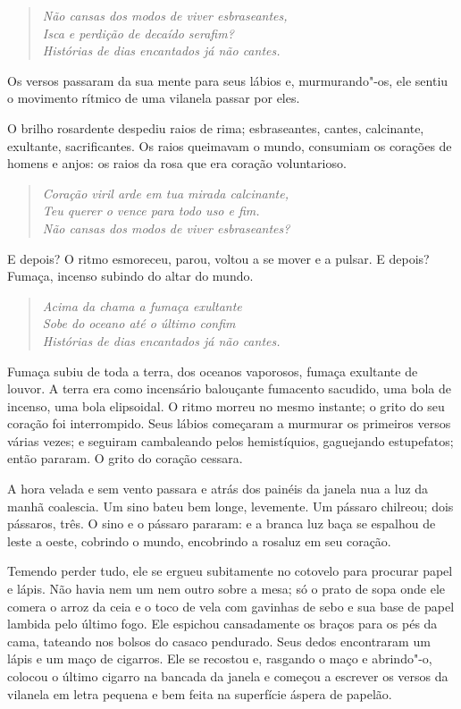 \begin{verse}\itshape
Não cansas dos modos de viver esbraseantes,\\
Isca e perdição de decaído serafim?\\
Histórias de dias encantados já não cantes.
\end{verse}

Os versos passaram da sua mente para seus lábios e, murmurando"-os, ele
sentiu o movimento rítmico de uma vilanela passar por eles.        

O brilho rosardente despediu raios de rima; esbraseantes, cantes,
calcinante, exultante, sacrificantes. Os raios queimavam o mundo,
consumiam os corações de homens e anjos: os raios da rosa que era
coração voluntarioso.

\begin{verse}\itshape
Coração viril arde em tua mirada calcinante,\\
Teu querer o vence para todo uso e fim.\\
Não cansas dos modos de viver esbraseantes?
\end{verse}

E depois? O ritmo esmoreceu, parou, voltou a se mover e a pulsar. E
depois? Fumaça, incenso subindo do altar do mundo.

\begin{verse}\itshape
Acima da chama a fumaça exultante \\
Sobe do oceano até o último confim\\
Histórias de dias encantados já não cantes.
\end{verse}

Fumaça subiu de toda a terra, dos oceanos vaporosos, fumaça exultante de
louvor. A terra era como incensário balouçante fumacento sacudido, uma
bola de incenso, uma bola elipsoidal. O ritmo morreu no mesmo instante;
o grito do seu coração foi interrompido. Seus lábios começaram a
murmurar os primeiros versos várias vezes; e seguiram cambaleando pelos
hemistíquios, gaguejando estupefatos; então pararam. O grito do coração
cessara.

A hora velada e sem vento passara e atrás dos painéis da janela nua a
luz da manhã coalescia. Um sino bateu bem longe, levemente. Um pássaro
chilreou; dois pássaros, três. O sino e o pássaro pararam: e a branca
luz baça se espalhou de leste a oeste, cobrindo o mundo, encobrindo a
rosaluz em seu coração.

Temendo perder tudo, ele se ergueu subitamente no cotovelo para procurar
papel e lápis. Não havia nem um nem outro sobre a mesa; só o prato de
sopa onde ele comera o arroz da ceia e o toco de vela com gavinhas de
sebo e sua base de papel lambida pelo último fogo. Ele espichou
cansadamente os braços para os pés da cama, tateando nos bolsos do
casaco pendurado. Seus dedos encontraram um lápis e um maço de
cigarros. Ele se recostou e, rasgando o maço e abrindo"-o, colocou o
último cigarro na bancada da janela e começou a escrever os versos da
vilanela em letra pequena e bem feita na superfície áspera de papelão.


